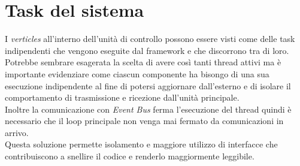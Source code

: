 \documentclass{report}
\begin{document}
\section{Task del sistema}

\par{
I \textit{verticles} all'interno dell'unità di controllo possono essere visti come delle task indipendenti che vengono eseguite dal framework e che discorrono tra di loro. \\
Potrebbe sembrare esagerata la scelta di avere così tanti thread attivi ma è importante evidenziare come ciascun componente ha bisongo di una sua esecuzione indipendente al fine di potersi aggiornare dall'esterno e di isolare il comportamento di trasmissione e ricezione dall'unità principale.\\ Inoltre la comunicazione con \textit{Event Bus} ferma l'esecuzione del thread quindi è necessario che il loop principale non venga mai fermato da comunicazioni in arrivo. \\
Questa soluzione permette isolamento e maggiore utilizzo di interfacce che contribuiscono a snellire il codice e renderlo maggiormente leggibile.\\
}
\end{document}
